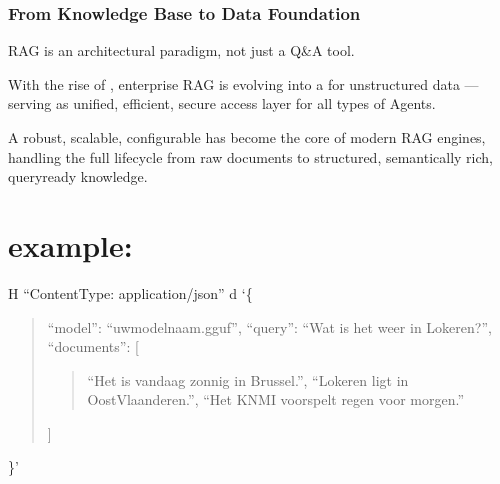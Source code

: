 \documentclass[letterpaper,10pt,english]{sphinxmanual}
\begin{document}
\subsection{From Knowledge Base to Data Foundation}
\label{\detokenize{blog-dec-2025:from-knowledge-base-to-data-foundation}}
\sphinxAtStartPar
RAG is an architectural paradigm, not just a Q\&A tool.

\sphinxAtStartPar
With the rise of , enterprise RAG is evolving into a
 for unstructured data — serving as
unified, efficient, secure access layer for all types of Agents.

\sphinxAtStartPar
A robust, scalable, configurable  has become the
core of modern RAG engines, handling the full lifecycle from raw
documents to structured, semantically rich, query\sphinxhyphen{}ready knowledge.

\sphinxstepscope


\chapter{example:}
\label{\detokenize{rerank:example}}\label{\detokenize{rerank:ragflow-models}}\label{\detokenize{rerank::doc}}\begin{description}
\sphinxAtStartPar
\sphinxhyphen{}H “Content\sphinxhyphen{}Type: application/json” \sphinxhyphen{}d ‘\{
\begin{quote}

\sphinxAtStartPar
“model”: “uw\sphinxhyphen{}modelnaam.gguf”,
“query”: “Wat is het weer in Lokeren?”,
“documents”: {[}
\begin{quote}

\sphinxAtStartPar
“Het is vandaag zonnig in Brussel.”,
“Lokeren ligt in Oost\sphinxhyphen{}Vlaanderen.”,
“Het KNMI voorspelt regen voor morgen.”
\end{quote}

\sphinxAtStartPar
{]}
\end{quote}

\sphinxAtStartPar
\}’

\end{description}
\end{document}
